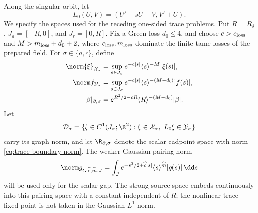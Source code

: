 Along the singular orbit, let
\[
 L_0(U,V)=(U'-sU-V,V'+U).
\]
We specify the spaces used for the receding one-sided trace problems.  Put
\(R=R_\delta\), \(J_a=[-R,0]\), and \(J_r=[0,R]\).  Fix a Green loss
\(d_0\le4\), and choose \(c>c_{\rm loss}\) and
\(M>m_{\rm loss}+d_0+2\), where \(c_{\rm loss},m_{\rm loss}\) dominate the
finite tame losses of the prepared field.  For
\(\sigma\in\{a,r\}\), define
\begin{align}
 \norm{\xi}_{\mathcal X_\sigma}
 &=\sup_{s\in J_\sigma}
   e^{-c|s|}\langle s\rangle^{-M}|\xi(s)|,\notag\\
 \norm f_{\mathcal Y_\sigma}
 &=\sup_{s\in J_\sigma}
   e^{-c|s|}\langle s\rangle^{-(M-d_0)}|f(s)|,       \label{eq:trace-strong-spaces}\\
 |\beta|_{\partial,\sigma}
 &=e^{R^2/2-cR}\langle R\rangle^{-(M-d_0)}|\beta|.  \label{eq:trace-boundary-norm}
\end{align}
Let
\[
 \mathcal D_\sigma
 =\{\xi\in C^1(J_\sigma;\R^2):
       \xi\in\mathcal X_\sigma,\ L_0\xi\in\mathcal Y_\sigma\}
\]
carry its graph norm, and let \(\R_{\partial,\sigma}\) denote the scalar
endpoint space with norm \cref{eq:trace-boundary-norm}.  The weaker Gaussian
pairing norm
\begin{equation}
 \norm g_{G;\widehat c,\widehat m,J}
 =\int_J e^{-s^2/2+\widehat c|s|}
          \langle s\rangle^{\widehat m}|g(s)|\,\dd s   \label{eq:trace-gaussian-space}
\end{equation}
will be used only for the scalar gap.  The strong source space embeds
continuously into this pairing space with a constant independent of \(R\);
the nonlinear trace fixed point is not taken in the Gaussian \(L^1\) norm.

